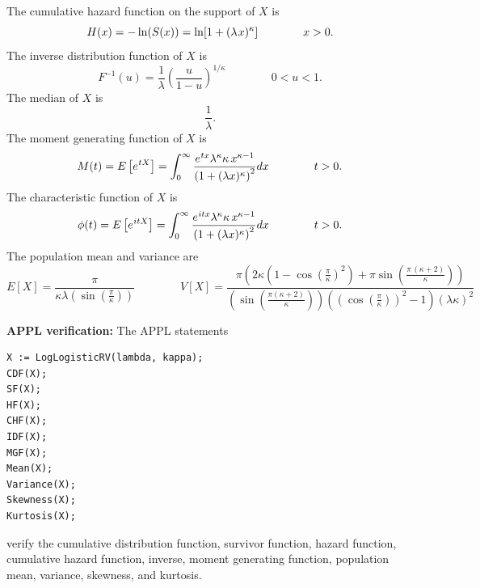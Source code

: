 \documentclass[12pt,fullpage]{article}
\begin{document}
The cumulative hazard function on the support of $X$ is
$$
H(x) = -\ln(S(x)) = \ln[1+(\lambda \kern 0.08 em x)^\kappa] \qquad \qquad x > 0.
$$
The inverse distribution function of $X$ is
$$
F ^ {-1}(u) =  \frac{1}{\lambda} \left( \frac{u}{1-u} \right)^{1/\kappa} \qquad \qquad 0 < u < 1.
$$
The median of $X$ is
$$
\frac{1}{\lambda}.
$$
The moment generating function of $X$ is
$$
M(t) = E\left[ e ^ {\kern 0.04 em tX} \right] =  \displaystyle \int _{0}^{\infty } \frac{{e^{\kern 0.04 em tx}}{\lambda}^{\kappa}\kappa\,{x}^{\kappa-1}}{ \left( 1+(\lambda x)^\kappa \right)^2} dx
\qquad \qquad t > 0.
$$
The characteristic function of $X$ is
$$
\phi(t) = E\left[ e ^ {\kern 0.04 em itX} \right] = \displaystyle \int _{0}^{\infty } \frac{{e^{\kern 0.04 em itx}}{\lambda}^{\kappa}\kappa\,{x}^{\kappa-1}}{ \left(1+(\lambda x)^\kappa \right)^2} dx
\qquad \qquad t > 0.
$$
The population mean and variance are
$$
E[X] = \frac{\pi} {{\kappa}{\lambda} \left( \sin \left( {\frac {\pi }{\kappa}} \right)  \right)} \qquad \qquad 
V[X] = \frac{\pi \left( 2 \kappa \left(1 -\cos \left( {\frac {\pi }{\kappa}} \right)^2 \right) +\pi \sin \left( {\frac {\pi \, \left( \kappa+2 \right)}{\kappa}} \right) \right)} { \left( \sin \left( {\frac {\pi \left( \kappa+2 \right) }{\kappa}} \right)  \right) \left(  \left( \cos \left( {\frac {\pi }{\kappa}} \right)  \right)^2
\mbox{}-1 \right)(\lambda \kappa)^2} \qquad \qquad 
$$

\noindent
{\bf APPL verification:}
The APPL statements
\begin{verbatim}
X := LogLogisticRV(lambda, kappa);
CDF(X);
SF(X);
HF(X);
CHF(X);
IDF(X);
MGF(X);
Mean(X);
Variance(X);
Skewness(X);
Kurtosis(X);
\end{verbatim}
verify the cumulative distribution function, survivor function, hazard function, cumulative hazard function, inverse, moment generating function, population mean, variance, skewness, and kurtosis.
\end{document}
